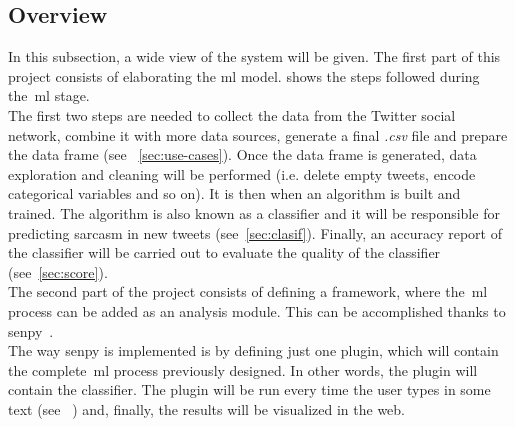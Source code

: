 \subsection{Overview}
In this subsection, a wide view of the system will be given. The first part of this project consists of elaborating the \ac{ml} model.
 shows the steps followed during the~\ac{ml} stage.\\
The first two steps are needed to collect the data from the Twitter social network, combine it with more data sources, generate a final \textit{.csv} file and prepare the data frame (see ~\cref{sec:use-cases}). Once the data frame is generated, data exploration and cleaning will be performed (i.e. delete empty tweets, encode categorical variables and so on). It is then when an algorithm is built and trained. The algorithm is also known as a classifier and it will be responsible for predicting sarcasm in new tweets (see~\cref{sec:clasif}). Finally, an accuracy report of the classifier will be carried out to evaluate the quality of the classifier (see~\cref{sec:score}).\\
The second part of the project consists of defining a framework, where the~\ac{ml} process can be added as an analysis module. This can be accomplished thanks to senpy~\cite{senpy}.\\
The way senpy is implemented is by defining just one plugin, which will contain the complete~\ac{ml} process previously designed.  In other words, the plugin will contain the classifier. The plugin will be run every time the user types in some text (see~ ) and, finally, the results will be visualized in the web.
